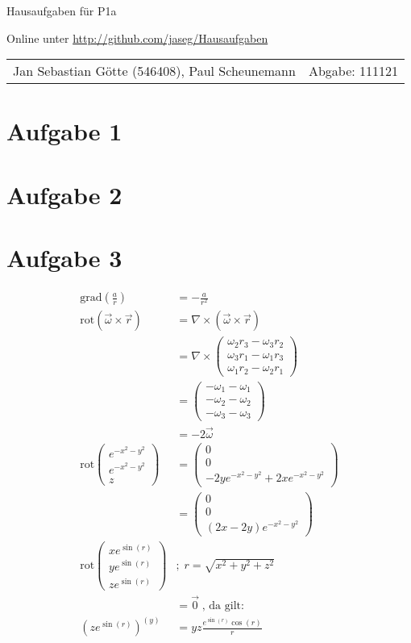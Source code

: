 \documentclass[12pt,a4paper,notitlepage]{article}
\newcommand{\grad}{\text{grad}}
\newcommand{\rot}{\text{rot}}
\newcommand{\aufgabe}[1]{\section*{\setcounter{section}{#1}Aufgabe #1}}
\begin{document}
\begin{center}
\Large Hausaufgaben für P1a

\normalsize Online unter \url{http://github.com/jaseg/Hausaufgaben}
\end{center}
\begin{tabularx}{\textwidth}{Xr}
Jan Sebastian Götte (546408), Paul Scheunemann&Abgabe: 111121
\end{tabularx}
\aufgabe{1}
\aufgabe{2}
\aufgabe{3}
\begin{align}
\grad\left(\frac{a}{r}\right)&=-\frac{a}{r^2}\\
\rot(\vec\omega\times\vec r)&=\nabla\times(\vec\omega\times\vec r)\\
&=\nabla\times\left(\begin{matrix}
\omega_2r_3-\omega_3r_2\\
\omega_3r_1-\omega_1r_3\\
\omega_1r_2-\omega_2r_1
\end{matrix}\right)\\
&=\left(\begin{matrix}
-\omega_1-\omega_1\\
-\omega_2-\omega_2\\
-\omega_3-\omega_3
\end{matrix}\right)\\
&=-2\vec\omega\\
\rot\left(\begin{matrix}
e^{-x^2-y^2}\\
e^{-x^2-y^2}\\
z
\end{matrix}\right)&=\left(\begin{matrix}
0\\
0\\
-2ye^{-x^2-y^2}+2xe^{-x^2-y^2}
\end{matrix}\right)\\
&=\left(\begin{matrix}
0\\
0\\
(2x-2y)e^{-x^2-y^2}
\end{matrix}\right)\\
\rot\left(\begin{matrix}
xe^{\sin(r)}\\
ye^{\sin(r)}\\
ze^{\sin(r)}
\end{matrix}\right)&;\;r=\sqrt{x^2+y^2+z^2}\\
&=\vec 0\;\text{, da gilt: }\\
\left(ze^{\sin(r)}\right)^{(y)}&=yz\frac{e^{\sin(r)}\cos(r)}{r}
\end{align}
\end{document}

